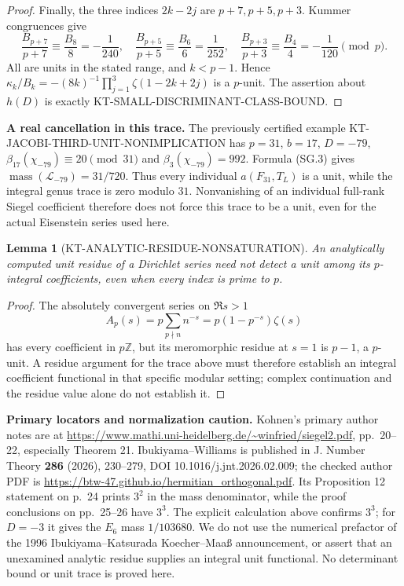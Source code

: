 \documentclass[11pt,a4paper]{article}
\newtheorem{lemma}[theorem]{Lemma}
\theoremstyle{definition}
\renewcommand{\paragraph}[1]{\par\smallskip\noindent\textbf{#1}\quad\ignorespaces}
\begin{document}
\begin{proof}
Finally, the three indices $2k-2j$ are $p+7,p+5,p+3$.
Kummer congruences give
\[
 \frac{B_{p+7}}{p+7}\equiv\frac{B_8}{8}=-\frac1{240},\quad
 \frac{B_{p+5}}{p+5}\equiv\frac{B_6}{6}=\frac1{252},\quad
 \frac{B_{p+3}}{p+3}\equiv\frac{B_4}{4}=-\frac1{120}
 \pmod p.
\]
All are units in the stated range, and $k<p-1$.  Hence
$\kappa_k/B_k=-(8k)^{-1}\prod_{j=1}^3\zeta(1-2k+2j)$ is a
$p$-unit.  The assertion about $h(D)$ is exactly
KT-SMALL-DISCRIMINANT-CLASS-BOUND.
\end{proof}

\paragraph{A real cancellation in this trace.}
The previously certified example
KT-JACOBI-THIRD-UNIT-NONIMPLICATION has $p=31$, $b=17$, $D=-79$,
$\beta_{17}(\chi_{-79})\equiv20\pmod{31}$ and
$\beta_3(\chi_{-79})=992$.  Formula (SG.3) gives
$\operatorname{mass}(\mathcal L_{-79})=31/720$.
Thus every individual $a(F_{31},T_L)$ is a unit, while the integral
genus trace is zero modulo $31$.  Nonvanishing of an individual
full-rank Siegel coefficient therefore does not force this trace to
be a unit, even for the actual Eisenstein series used here.

\begin{lemma}[KT-ANALYTIC-RESIDUE-NONSATURATION]
An analytically computed unit residue of a Dirichlet series need not
detect a unit among its $p$-integral coefficients, even when every
index is prime to $p$.
\end{lemma}
\begin{proof}
The absolutely convergent series on $\Re s>1$
\[
 A_p(s)=p\sum_{p\nmid n}n^{-s}=p(1-p^{-s})\zeta(s)
\]
has every coefficient in $p\mathbb Z$, but its meromorphic residue
at $s=1$ is $p-1$, a $p$-unit.  A residue argument for the trace above
must therefore establish an integral coefficient functional in that
specific modular setting; complex continuation and the residue value
alone do not establish it.
\end{proof}

\paragraph{Primary locators and normalization caution.}
Kohnen's primary author notes are at
\url{https://www.mathi.uni-heidelberg.de/~winfried/siegel2.pdf},
pp.~20--22, especially Theorem 21.  Ibukiyama--Williams is published
in J. Number Theory \textbf{286} (2026), 230--279,
DOI 10.1016/j.jnt.2026.02.009; the checked author PDF is
\url{https://btw-47.github.io/hermitian_orthogonal.pdf}.
Its Proposition 12 statement on p.~24 prints $3^2$ in the mass
denominator, while the proof conclusions on pp.~25--26 have $3^3$.
The explicit calculation above confirms $3^3$; for $D=-3$ it gives
the $E_6$ mass $1/103680$.  We do not use the numerical prefactor of
the 1996 Ibukiyama--Katsurada Koecher--Maa\ss{} announcement, or
assert that an unexamined analytic residue supplies an integral unit
functional.  No determinant bound or unit trace is proved here.
\end{document}
